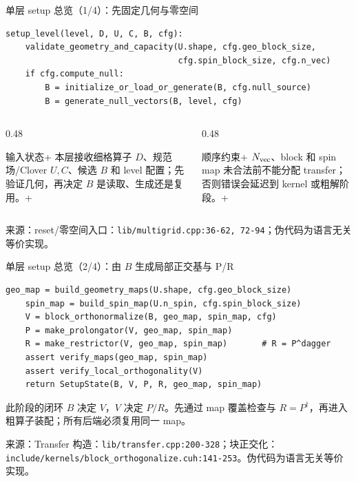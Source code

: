\documentclass[UTF8,aspectratio=169,11pt]{ctexbeamer}
\newcommand{\source}[1]{\vspace{0.05em}\par{\raggedright\scriptsize\color{muted}来源：#1\par}}
\newcommand{\codepath}[1]{\nolinkurl{#1}}
\begin{document}
\begin{frame}[fragile,t]{单层 setup 总览（1/4）：先固定几何与零空间}
  \small
  \begin{lstlisting}[firstnumber=1]
setup_level(level, D, U, C, B, cfg):
    validate_geometry_and_capacity(U.shape, cfg.geo_block_size,
                                   cfg.spin_block_size, cfg.n_vec)
    if cfg.compute_null:
        B = initialize_or_load_or_generate(B, cfg.null_source)
        B = generate_null_vectors(B, level, cfg)
  \end{lstlisting}
  \begin{columns}[T,totalwidth=\textwidth]
    \begin{column}{0.48\textwidth}
      \begin{block}{输入状态}\n+        本层接收细格算子 \(D\)、规范场/Cl​​over \(U,C\)、候选 \(B\) 和 level 配置；先验证几何，再决定 \(B\) 是读取、生成还是复用。\n+      \end{block}
    \end{column}
    \begin{column}{0.48\textwidth}
      \begin{alertblock}{顺序约束}\n+        \(N_{\rm vec}\)、block 和 spin map 未合法前不能分配 transfer；否则错误会延迟到 kernel 或粗解阶段。\n+      \end{alertblock}
    \end{column}
  \end{columns}
  \source{reset/零空间入口：\codepath{lib/multigrid.cpp:36-62, 72-94}；伪代码为语言无关等价实现。}
\end{frame}

\begin{frame}[fragile,t]{单层 setup 总览（2/4）：由 \(B\) 生成局部正交基与 P/R}
  \small
  \begin{lstlisting}[firstnumber=1]
    geo_map = build_geometry_maps(U.shape, cfg.geo_block_size)
    spin_map = build_spin_map(U.n_spin, cfg.spin_block_size)
    V = block_orthonormalize(B, geo_map, spin_map, cfg)
    P = make_prolongator(V, geo_map, spin_map)
    R = make_restrictor(V, geo_map, spin_map)       # R = P^dagger
    assert verify_maps(geo_map, spin_map)
    assert verify_local_orthogonality(V)
    return SetupState(B, V, P, R, geo_map, spin_map)
  \end{lstlisting}
  \begin{block}{此阶段的闭环}
    \(B\) 决定 \(V\)，\(V\) 决定 \(P/R\)。先通过 map 覆盖检查与 \(R=P^\dagger\)，再进入粗算子装配；所有后端必须复用同一 map。
  \end{block}
  \source{Transfer 构造：\codepath{lib/transfer.cpp:200-328}；块正交化：\codepath{include/kernels/block_orthogonalize.cuh:141-253}。伪代码为语言无关等价实现。}
\end{frame}
\end{document}
